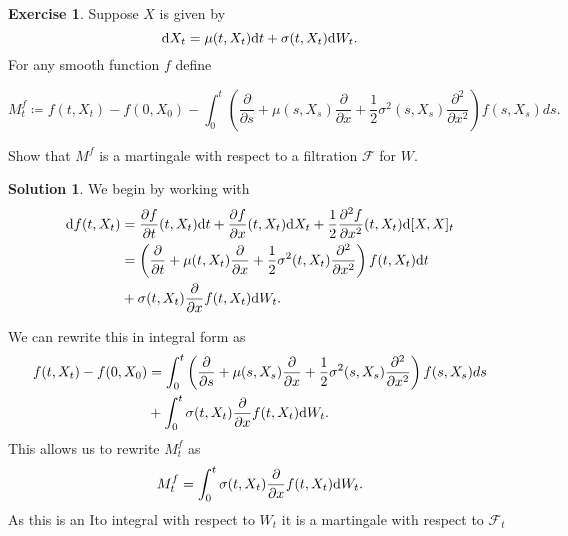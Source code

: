\documentclass[12pt]{article}
\newcommand{\calF}{\mathcal{F}}
\theoremstyle{definition}
\newtheorem{exer}{Exercise}
\newtheorem{sol}{Solution}
\theoremstyle{remark}
\def\d{{\rm d}}
\begin{document}
\newpage

\begin{exer}
Suppose $X$ is given by
\begin{equation*}
    \d X_{t} = \mu(t, X_{t}) \d t + \sigma(t, X_{t}) \d W_{t}.
\end{equation*}
For any smooth function $f$ define

\begin{equation*}
    M_{t}^{f} \coloneqq f(t, X_{t}) - f(0, X_{0}) - \int_{0}^{t} \left( \frac{\partial }{\partial s} + \mu(s, X_{s}) \frac{\partial }{\partial x} + \frac{1}{2} \sigma^{2}(s, X_{s}) \frac{\partial^{2} }{\partial x^{2}}     \right ) f(s, X_{s})ds.
\end{equation*}

Show that $ M^{f} $ is a martingale with respect to a filtration $\calF$ for $W$.
\end{exer}

\begin{sol}
We begin by working with
\begin{align*}
    \d f(t, X_{t}) &= \frac{\partial f}{\partial t}(t, X_{t}) \d t + \frac{\partial f}{\partial x} (t, X_{t}) \d X_{t}  + \frac{1}{2} \frac{\partial^{2} f}{\partial x^{2}} (t, X_{t}) \d[X, X]_{t}\\
                   &= \left( \frac{\partial}{\partial t} + \mu(t, X_{t}) \frac{\partial }{\partial x} + \frac{1}{2} \sigma^{2}(t, X_{t}) \frac{\partial^{2} }{\partial x^{2}}  \right)f(t, X_{t}) \d t\\
                   &+ \sigma(t, X_{t})  \frac{\partial }{\partial x} f(t, X_{t}) \d W_{t}.
\end{align*}

We can rewrite this in integral form as
\begin{align*}
    f(t,X_{t}) - f(0, X_{0}) &= \int_{0}^{t} \left( \frac{\partial }{\partial s} + \mu(s, X_{s}) \frac{\partial }{\partial x} + \frac{1}{2} \sigma^{2}(s, X_{s}) \frac{\partial^{2} }{\partial x^{2}} \right ) f(s, X_{s})ds\\
    &+ \int_{0}^{t} \sigma(t, X_{t})  \frac{\partial }{\partial x} f(t, X_{t}) \d W_{t}.
\end{align*}
This allows us to rewrite $M_{t}^{f}$ as
\begin{align*}
    M_{t}^{f} = \int_{0}^{t} \sigma(t, X_{t}) \frac{\partial}{\partial x} f(t, X_{t}) \d W_{t}.
\end{align*}
As this is an Ito integral with respect to $W_{t}$ it is a martingale with respect to $\calF_{t}$
\end{sol}
\end{document}
